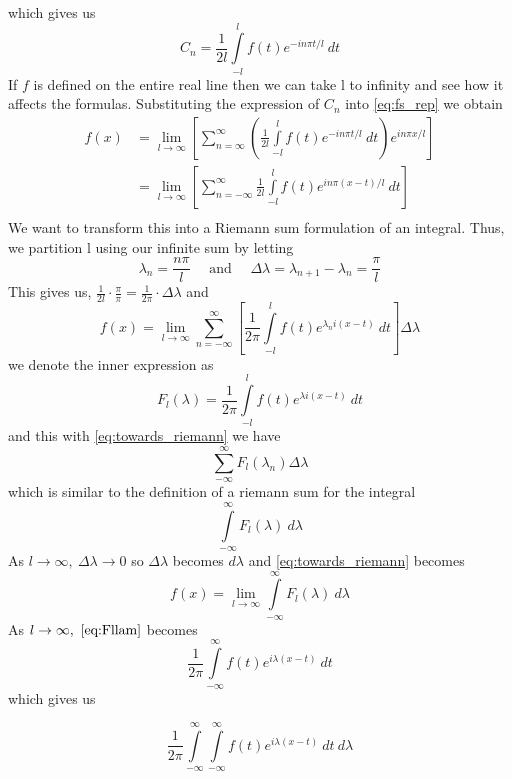 which gives us 
\[
    C_n = \frac{ 1 }{ 2l } \int\limits_{-l}^{l} f(t) e^{ -in\pi t / l} \ dt 
\]
If $ f $ is defined on the entire real line then we can take l to infinity and see how it
affects the formulas.
Substituting the expression of $ C_n $ into \ref{eq:fs_rep} we obtain 
\begin{align*}
    f(x)  &= \lim_{l \to \infty} \left[ \sum_{n=\infty}^{\infty} \left( \frac{ 1 }{ 2l }
    \int\limits_{-l}^{l} f(t) e^{ -in\pi t / l } \ dt\right) e^{ in\pi x / l}  \right]  \\ 
          &= \lim_{l\to \infty} \left[ \sum_{n=-\infty}^{\infty} \frac{ 1 }{ 2l }
          \int\limits_{-l}^{l} f(t) e^{ in\pi(x-t) / l} \ dt   \right]  \\ 
\end{align*}
We want to transform this into a Riemann sum formulation of an integral.
Thus, we partition l using our infinite sum by letting 
\[
    \lambda_n = \frac{ n\pi }{ l } \quad \text{ and } \quad \Delta \lambda = \lambda_{n+1}
    - \lambda_n = \frac{ \pi  }{ l } 
\]
This gives us, $ \frac{ 1 }{ 2l  } \cdot \frac{ \pi }{ \pi } = \frac{ 1 }{ 2\pi } \cdot
\Delta\lambda   $ and 
\begin{equation} 
    f(x) = \lim_{l\to \infty}  \sum_{n=-\infty}^{\infty} \left[\frac{ 1 }{ 2\pi }
          \int\limits_{-l}^{l} f(t) e^{ \lambda_ni(x-t) } \ dt   \right]  \Delta \lambda
    \label{eq:towards_riemann}
\end{equation}
we denote the inner expression as 
\begin{equation}
    F_l(\lambda) = \frac{ 1 }{ 2\pi  } \int\limits_{-l}^{l} f(t) e^{ \lambda i (x-t) } \
    dt 
    \label{eq:Fllam}
\end{equation} 
and this with \ref{eq:towards_riemann} we have 
\[
    \sum_{-\infty}^{\infty} F_l(\lambda_n) \Delta\lambda 
\]
which is similar to the definition of a riemann sum for the integral 
\[
    \int\limits_{-\infty}^{\infty} F_l(\lambda) \ d\lambda 
\]
As $ l \to \infty, \ \Delta \lambda \to 0  $ so $ \Delta \lambda  $ becomes $ d\lambda  $
and \ref{eq:towards_riemann} becomes 
\[
    f(x) = \lim_{l\to\infty} \int\limits_{-\infty}^{\infty} F_l(\lambda) \ d\lambda 
\]
As $ l \to \infty, \ \ref{eq:Fllam} $ becomes 
\begin{equation}
    \frac{ 1 }{ 2\pi } \int\limits_{-\infty}^{\infty} f(t) e^{ i\lambda(x-t)} \ dt
    \label{eq:fllaminft} 
\end{equation} 
which gives us 

\[
    \frac{ 1 }{ 2\pi } \int\limits_{-\infty}^{\infty}   \int\limits_{-\infty}^{\infty} 
    f(t) e^{ i\lambda(x-t)} \ dt \ d\lambda 
\]

